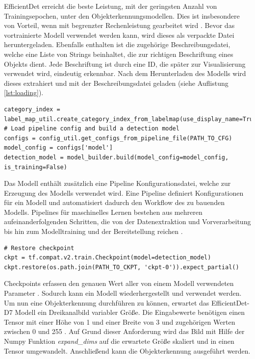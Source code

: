 EfficientDet erreicht die beste Leistung, mit der geringsten Anzahl von Trainingsepochen, unter den Objekterkennungsmodellen. Dies ist insbesondere von Vorteil, wenn mit begrenzter Rechenleistung gearbeitet wird \cite{solawetz}. Bevor das vortrainierte Modell verwendet werden kann, wird dieses als verpackte Datei heruntergeladen. Ebenfalls enthalten ist die zugehörige Beschreibungsdatei, welche eine Liste von Strings beinhaltet, die zur richtigen Beschriftung eines Objekts dient. Jede Beschriftung ist durch eine ID, die später zur Visualisierung verwendet wird, eindeutig erkennbar. Nach dem Herunterladen des Modells wird dieses extrahiert und mit der Beschreibungsdatei geladen (siehe Auflistung \ref{lst:loading})\cite{obd_api}.

\vspace*{10mm}
\begin{lstlisting}[caption={Laden der Beschreibungsdatei mit anschließendem Erzeugen des Modells}, label={lst:loading}]
category_index = label_map_util.create_category_index_from_labelmap(use_display_name=True)
# Load pipeline config and build a detection model
configs = config_util.get_configs_from_pipeline_file(PATH_TO_CFG)
model_config = configs['model']
detection_model = model_builder.build(model_config=model_config, is_training=False)
\end{lstlisting}

Das Modell enthält zusätzlich eine Pipeline Konfigurationsdatei, welche zur Erzeugung des Modells verwendet wird. Eine Pipeline definiert Konfigurationen für ein Modell und automatisiert dadurch den Workflow des zu bauenden Modells. Pipelines für maschinelles Lernen bestehen aus mehreren aufeinanderfolgenden Schritten, die von der Datenextraktion und Vorverarbeitung bis hin zum Modelltraining und der Bereitstellung reichen \cite{valohai}.

\vspace*{10mm}
\begin{lstlisting}[caption={Laden der Checkpoints}, label={lst:checkpoints}]
# Restore checkpoint
ckpt = tf.compat.v2.train.Checkpoint(model=detection_model)
ckpt.restore(os.path.join(PATH_TO_CKPT, 'ckpt-0')).expect_partial()
\end{lstlisting}

Checkpoints erfassen den genauen Wert aller von einem Modell verwendeten Parameter \cite{tf_checkpoint}. Sodurch kann ein Modell wiederhergestellt und verwendet werden. Um nun eine Objekterkennung durchführen zu können, erwartet das EfficientDet-D7 Modell ein Dreikanalbild variabler Größe. Die Eingabewerte benötigen einen Tensor mit einer Höhe von 1 und einer Breite von 3 und zugehörigen Werten zwischen 0 und 255 \cite{efficientdet}. Auf Grund dieser Anforderung wird das Bild mit Hilfe der \gls{Numpy} Funktion \emph{expand\_dims} auf die erwartete Größe skaliert und in einen Tensor umgewandelt. Anschließend kann die Objekterkennung ausgeführt werden.

